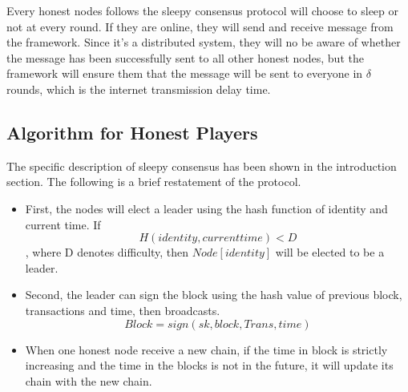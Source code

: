 \documentclass{llncs}
\begin{document}
Every honest nodes follows the sleepy consensus protocol will choose to sleep or not at every round. If they are online, they will send and receive message from the framework. Since it's a distributed system, they will no be aware of whether the message has been successfully sent to all other honest nodes, but the framework will ensure them that the message will be sent to everyone in $\delta $ rounds, which is the internet transmission delay time.

\subsection{Algorithm for Honest Players}
\quad The specific description of sleepy consensus has been shown in the introduction section. The following is a brief restatement of the protocol.
\begin{itemize}
	\item First, the nodes will elect a leader using the hash function of identity and current time. If
		 $$H(identity, current time) < D$$,
		 where D denotes difficulty, then $Node[identity]$ will be elected to be a leader.\\
	\item Second, the leader can sign the block using the hash value of previous block, transactions and time, then broadcasts.
		 $$Block = sign(sk, block, Trans, time)$$
	\item When one honest node receive a new chain, if the time in block is strictly increasing and the time in the blocks is not in the future, it will update its chain with the new chain.	
\end{itemize}
\end{document}
